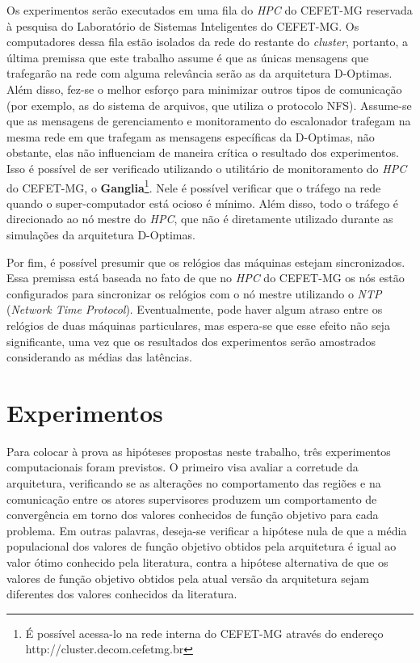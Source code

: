 Os experimentos serão executados em uma fila do \textit{HPC} do CEFET-MG reservada à pesquisa do Laboratório de Sistemas Inteligentes do CEFET-MG. Os computadores dessa fila estão isolados da rede do restante do \textit{cluster}, portanto, a última premissa que este trabalho assume é que as únicas mensagens que trafegarão na rede com alguma relevância serão as da arquitetura D-Optimas. Além disso, fez-se o melhor esforço para minimizar outros tipos de comunicação (por exemplo, as do sistema de arquivos, que utiliza o protocolo NFS). Assume-se que as mensagens de gerenciamento e monitoramento do escalonador trafegam na mesma rede em que trafegam as mensagens específicas da D-Optimas, não obstante, elas não influenciam de maneira crítica o resultado dos experimentos. Isso é possível de ser verificado utilizando o utilitário de monitoramento do \textit{HPC} do CEFET-MG, o \textbf{Ganglia}\footnote{É possível acessa-lo na rede interna do CEFET-MG através do endereço http://cluster.decom.cefetmg.br}. Nele é possível verificar que o tráfego na rede quando o super-computador está ocioso é mínimo. Além disso, todo o tráfego é direcionado ao nó mestre do \textit{HPC}, que não é diretamente utilizado durante as simulações da arquitetura D-Optimas.

Por fim, é possível presumir que os relógios das máquinas estejam sincronizados. Essa premissa está baseada no fato de que no \textit{HPC} do CEFET-MG os nós estão configurados para sincronizar os relógios com o nó mestre utilizando o \textit{NTP} (\textit{Network Time Protocol}). Eventualmente, pode haver algum atraso entre os relógios de duas máquinas particulares, mas espera-se que esse efeito não seja significante, uma vez que os resultados dos experimentos serão amostrados considerando as médias das latências. 

\section{Experimentos}
\label{sec:experimentos}
Para colocar à prova as hipóteses propostas neste trabalho,  três experimentos computacionais foram previstos. O primeiro visa avaliar a corretude da arquitetura, verificando se as alterações no comportamento das regiões e na comunicação entre os atores supervisores produzem um comportamento de convergência em torno dos valores conhecidos de função objetivo para cada problema. Em outras palavras, deseja-se verificar a hipótese nula de que a média populacional dos valores de função objetivo obtidos pela arquitetura é igual ao valor ótimo conhecido pela literatura, contra a hipótese alternativa de que os valores de função objetivo  obtidos pela  atual versão da arquitetura sejam  diferentes dos valores conhecidos da literatura. 

